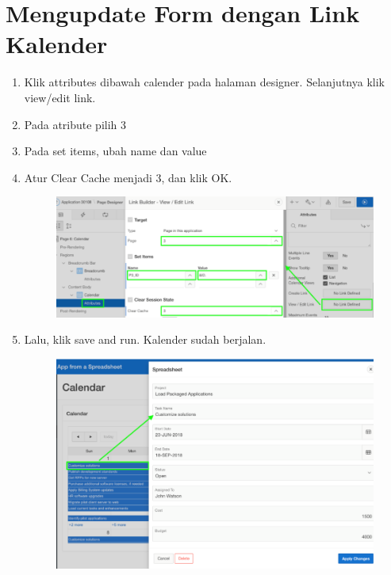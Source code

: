 \section{Mengupdate Form dengan Link Kalender}
\begin{enumerate}
    \item{Klik attributes dibawah calender pada halaman designer. Selanjutnya klik view/edit link.}
    \item{Pada atribute pilih 3}
    \item {Pada set items, ubah name dan value}
    \item {Atur Clear Cache menjadi 3, dan klik OK.}
    
\begin{figure}[!htbp]
    \centering
    \includegraphics[scale=0.5]{section/gambar_bab2/kalender7.png}
    \label{penanda}
\end{figure}

    \item {Lalu, klik save and run. Kalender sudah berjalan.}
    
\begin{figure}[!htbp]
    \centering
    \includegraphics[scale=0.5]{section/gambar_bab2/kalender8.png}
    \label{penanda}
\end{figure}
\end{enumerate}